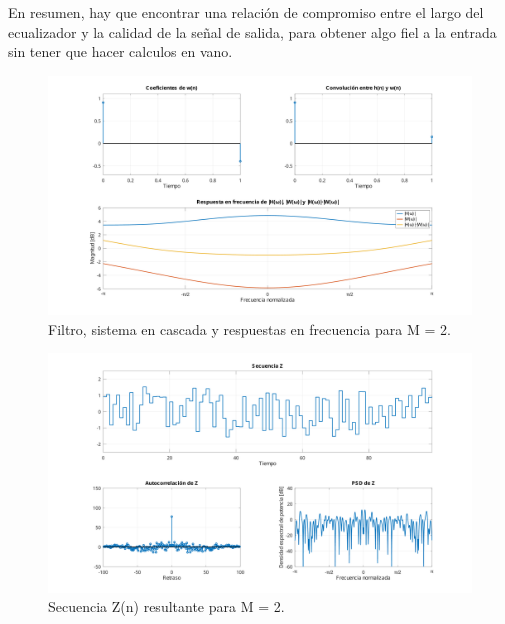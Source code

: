 En resumen, hay que encontrar una relación de compromiso entre el largo del ecualizador y la calidad de la señal de salida, para obtener algo fiel a la entrada sin tener que hacer calculos en vano. 

\begin{figure}[!hbp]
	\centering
	\includegraphics[width=1\linewidth,trim=4cm 0 4cm 0,clip]{img/ej4_2_coef.pdf}
	\caption{Filtro, sistema en cascada y respuestas en frecuencia para M = 2.}
	\label{fig:ej4_2_coef}
\end{figure}

\begin{figure}[!hbp]
	\centering
	\includegraphics[width=1\linewidth,trim=4cm 0 4cm 0,clip]{img/ej4_2_z.pdf}
	\caption{Secuencia Z(n) resultante para M = 2.}
	\label{fig:ej4_2_z}
\end{figure}

